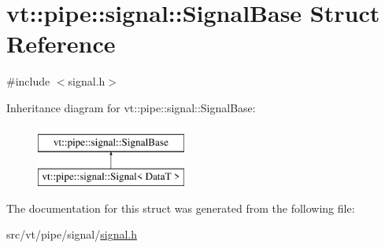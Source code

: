 \hypertarget{structvt_1_1pipe_1_1signal_1_1_signal_base}{}\section{vt\+:\+:pipe\+:\+:signal\+:\+:Signal\+Base Struct Reference}
\label{structvt_1_1pipe_1_1signal_1_1_signal_base}


{\ttfamily \#include $<$signal.\+h$>$}

Inheritance diagram for vt\+:\+:pipe\+:\+:signal\+:\+:Signal\+Base\+:\begin{figure}[H]
\begin{center}
\leavevmode
\includegraphics[height=2.000000cm]{structvt_1_1pipe_1_1signal_1_1_signal_base}
\end{center}
\end{figure}


The documentation for this struct was generated from the following file\+:\begin{DoxyCompactItemize}
\item 
src/vt/pipe/signal/\hyperlink{signal_8h}{signal.\+h}\end{DoxyCompactItemize}
